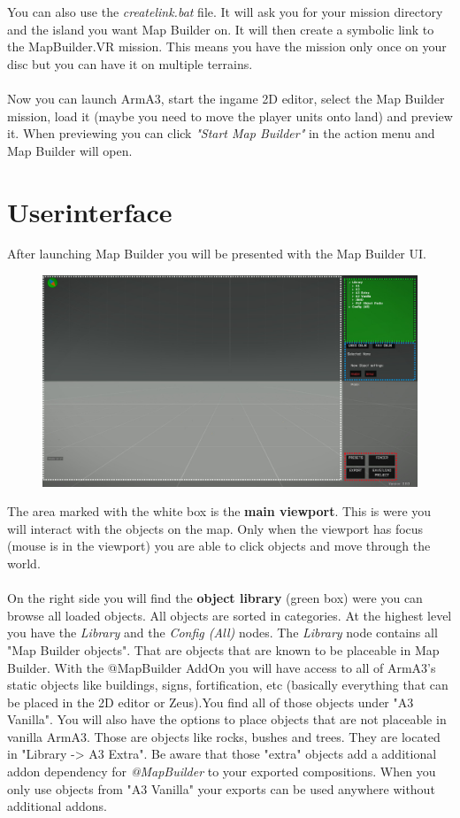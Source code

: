 \documentclass[english]{scrartcl}
\begin{document}
	You can also use the \textit{createlink.bat} file. It will ask you for your mission directory and the island you want Map Builder on. It will then create a symbolic link to the MapBuilder.VR mission. This means you have the mission only once on your disc but you can have it on multiple terrains.\\
	\\
	Now you can launch ArmA3, start the ingame 2D editor, select the Map Builder mission, load it (maybe you need to move the player units onto land) and preview it. When previewing you can click \textit{"Start Map Builder"} in the action menu and Map Builder will open.
	\section{Userinterface}
	After launching Map Builder you will be presented with the Map Builder UI.
	\begin{figure}[hb]
		\centering
		\includegraphics[width=5.8in]{images/mb/mbui.png}
	\end{figure}
	\FloatBarrier
	The area marked with the white box is the \textbf{main viewport}. This is were you will interact with the objects on the map. Only when the viewport has focus (mouse is in the viewport) you are able to click objects and move through the world.\\
	\\
	On the right side you will find the \textbf{object library} (green box) were you can browse all loaded objects. All objects are sorted in categories. At the highest level you have the \textit{Library} and the \textit{Config (All)} nodes. The \textit{Library} node contains all "Map Builder objects". That are objects that are known to be placeable in Map Builder. With the @MapBuilder AddOn you will have access to all of ArmA3's static objects like buildings, signs, fortification, etc (basically everything that can be placed in the 2D editor or Zeus).You find all of those objects under "A3 Vanilla". You will also have the options to place objects that are not placeable in vanilla ArmA3. Those are objects like rocks, bushes and trees. They are located in "Library -> A3 Extra". Be aware that those "extra" objects add a additional addon dependency for \textit{@MapBuilder} to your exported compositions. When you only use objects from "A3 Vanilla" your exports can be used anywhere without additional addons.\\
\end{document}
